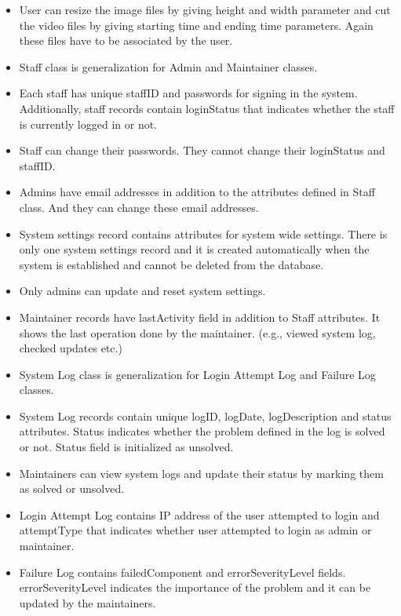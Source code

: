\begin{itemize}
	\item User can resize the image files by giving height and width parameter and cut the video files by giving starting time and ending time parameters. Again these files have to be associated by the user.
	\item Staff class is generalization for Admin and Maintainer classes.
	\item Each staff has unique staffID and passwords for signing in the system. Additionally, staff records contain loginStatus that indicates whether the staff is currently logged in or not.
	\item Staff can change their passwords. They cannot change their loginStatus and staffID.
	\item Admins have email addresses in addition to the attributes defined in Staff class. And they can change these email addresses.
	\item System settings record contains attributes for system wide settings. There is only one system settings record and it is created automatically when the system is established and cannot be deleted from the database.
	\item Only admins can update and reset system settings.
	\item Maintainer records have lastActivity field in addition to Staff attributes. It shows the last operation done by the maintainer. (e.g.,  viewed system log, checked updates etc.)
	\item System Log class is generalization for Login Attempt Log and Failure Log classes.
	\item System Log records contain unique logID, logDate, logDescription and status attributes. Status indicates whether the problem defined in the log is solved or not. Status field is initialized as unsolved.
	\item Maintainers can view system logs and update their status by marking them as solved or unsolved.
	\item Login Attempt Log contains IP address of the user attempted to login and attemptType that indicates whether user attempted to login as admin or maintainer.
	\item Failure Log contains failedComponent and errorSeverityLevel fields. errorSeverityLevel indicates the importance of the problem and it can be updated by the maintainers.

	
	

\end{itemize}